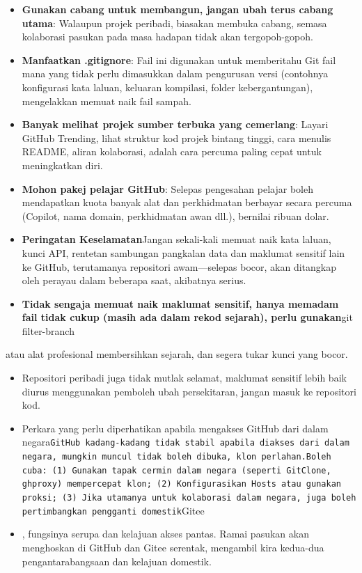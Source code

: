 \begin{itemize}
  \item \textbf{Gunakan cabang untuk membangun, jangan ubah terus cabang utama}: Walaupun projek peribadi, biasakan membuka cabang, semasa kolaborasi pasukan pada masa hadapan tidak akan tergopoh-gopoh.
  \item \textbf{Manfaatkan .gitignore}: Fail ini digunakan untuk memberitahu Git fail mana yang tidak perlu dimasukkan dalam pengurusan versi (contohnya konfigurasi kata laluan, keluaran kompilasi, folder kebergantungan), mengelakkan memuat naik fail sampah.
  \item \textbf{Banyak melihat projek sumber terbuka yang cemerlang}: Layari GitHub Trending, lihat struktur kod projek bintang tinggi, cara menulis README, aliran kolaborasi, adalah cara percuma paling cepat untuk meningkatkan diri.
  \item \textbf{Mohon pakej pelajar GitHub}: Selepas pengesahan pelajar boleh mendapatkan kuota banyak alat dan perkhidmatan berbayar secara percuma (Copilot, nama domain, perkhidmatan awan dll.), bernilai ribuan dolar.
  \item \textbf{Peringatan Keselamatan}Jangan sekali-kali memuat naik kata laluan, kunci API, rentetan sambungan pangkalan data dan maklumat sensitif lain ke GitHub, terutamanya repositori awam—selepas bocor, akan ditangkap oleh perayau dalam beberapa saat, akibatnya serius.
  \item \textbf{Tidak sengaja memuat naik maklumat sensitif, hanya memadam fail tidak cukup (masih ada dalam rekod sejarah), perlu gunakan}git filter-branch
\end{itemize}

\begin{tcbwarn}{atau alat profesional membersihkan sejarah, dan segera tukar kunci yang bocor.}
\begin{itemize}
  \item Repositori peribadi juga tidak mutlak selamat, maklumat sensitif lebih baik diurus menggunakan pemboleh ubah persekitaran, jangan masuk ke repositori kod.
  \item Perkara yang perlu diperhatikan apabila mengakses GitHub dari dalam negara\texttt{GitHub kadang-\allowbreak kadang tidak stabil apabila diakses dari dalam negara, mungkin muncul tidak boleh dibuka, klon perlahan.\allowbreak  Boleh cuba: (1) Gunakan tapak cermin dalam negara (seperti GitClone, ghproxy) mempercepat klon; (2) Konfigurasikan Hosts atau gunakan proksi; (3) Jika utamanya untuk kolaborasi dalam negara, juga boleh pertimbangkan pengganti domestik}Gitee
  \item , fungsinya serupa dan kelajuan akses pantas. Ramai pasukan akan menghoskan di GitHub dan Gitee serentak, mengambil kira kedua-dua pengantarabangsaan dan kelajuan domestik.
\end{itemize}

\end{tcbwarn}

